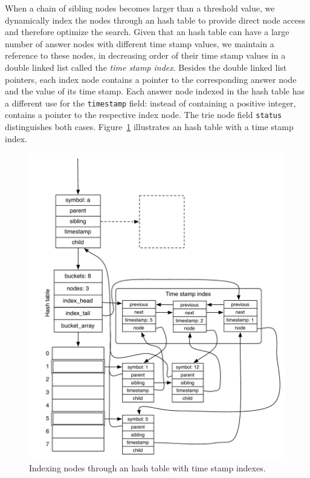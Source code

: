 When a chain of sibling nodes becomes larger than a threshold value, we dynamically index the
nodes through an hash table to provide direct node access and therefore optimize the search. Given
that an hash table can have a large number of answer nodes with different time stamp values, we maintain
a reference to these nodes, in decreasing order of their time stamp values in a double linked list
called the \textit{time stamp index}.
Besides the double linked list pointers, each index node contains a pointer to the corresponding
answer node and the value of its time stamp. Each answer node indexed in the hash table has a different use
for the \texttt{timestamp} field: instead of containing a positive integer, contains a pointer
to the respective index node. The trie node field \texttt{status} distinguishes
both cases. Figure~\ref{fig:hash_table_tst} illustrates an hash table with a time stamp index.

\begin{figure}[ht]
  \centering
    \includegraphics[scale=0.6]{hash_table_tst.pdf}
  \caption{Indexing nodes through an hash table with time stamp indexes.}
  \label{fig:hash_table_tst}
\end{figure}

